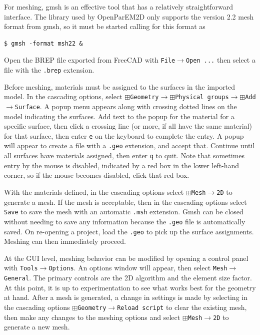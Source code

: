 \documentclass[titlepage]{article}
\renewcommand\_{\textunderscore\linebreak[1]}
\begin{document}
For meshing, gmsh is an effective tool that has a relatively straightforward interface.  The library used by OpenParEM2D only supports the version 2.2 mesh format from gmsh, so it must be started calling for this format as
\begin{Verbatim}[fontsize=\small]
   $ gmsh -format msh22 &
\end{Verbatim}
\noindent Open the BREP file exported from FreeCAD with \texttt{File}$\rightarrow$\texttt{Open ...} then select a file with the \texttt{.brep} extension.

Before meshing, materials must be assigned to the surfaces in the imported model.  In the cascading options, select $\boxplus$\texttt{Geometry}$\rightarrow$$\boxplus$\texttt{Physical groups}$\rightarrow$$\boxplus$\texttt{Add}$\rightarrow$\texttt{Surface}.  A popup menu appears along with crossing dotted lines on the model indicating the surfaces.  Add text to the popup for the material for a specific surface, then click a crossing line (or more, if all have the same material) for that surface, then enter \texttt{e} on the keyboard to complete the entry.  A popup will appear to create a file with a \texttt{.geo} extension, and accept that.  Continue until all surfaces have materials assigned, then enter \texttt{q} to quit.  Note that sometimes entry by the mouse is disabled, indicated by a red box in the lower left-hand corner, so if the mouse becomes disabled, click that red box.

With the materials defined, in the cascading options select $\boxplus$\texttt{Mesh}$\rightarrow$\texttt{2D} to generate a mesh.  If the mesh is acceptable, then in the cascading options select \texttt{Save} to save the mesh with an automatic \texttt{.msh} extension.  Gmsh can be closed without needing to save any information because the \texttt{.geo} file is automatically saved.
On re-opening a project, load the \texttt{.geo} to pick up the surface assignments.  Meshing can then immediately proceed.

At the GUI level, meshing behavior can be modified by opening a control panel with \texttt{Tools}$\rightarrow$\texttt{Options}.  An options window will appear, then select \texttt{Mesh}$\rightarrow$\texttt{General}.  The primary controls are the 2D algorithm and the element size factor.  At this point, it is up to experimentation to see what works best for the geometry at hand.  After a mesh is generated, a change in settings is made by selecting in the cascading options $\boxplus$\texttt{Geometry}$\rightarrow$\texttt{Reload script} to clear the existing mesh, then make any changes to the meshing options and select $\boxplus$\texttt{Mesh}$\rightarrow$\texttt{2D} to generate a new mesh.
\end{document}
